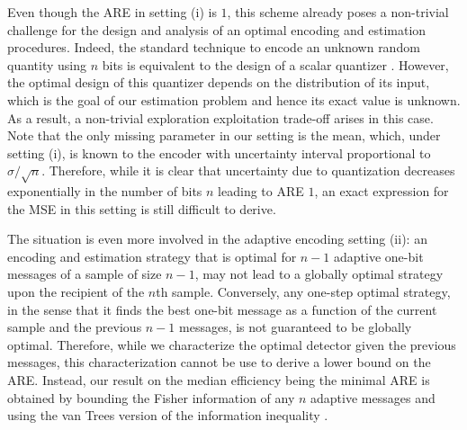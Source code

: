 \documentclass[letterpaper, conference, 11pt]{IEEEtran}      %
\begin{document}
Even though the ARE in setting (i) is $1$, this scheme already poses a non-trivial challenge for the design and analysis of an optimal encoding and estimation procedures. Indeed, the standard technique to encode an unknown random quantity using $n$ bits is equivalent to the design of a scalar quantizer \cite{gray1998quantization}. However, the optimal design of this quantizer depends on the distribution of its input, which is the goal of our estimation problem and hence its exact value is unknown. As a result, a non-trivial exploration exploitation trade-off arises in this case. Note that the only missing parameter in our setting is the mean, which, under setting (i), is known to the encoder with uncertainty interval proportional to $\sigma/\sqrt{n}$. Therefore, while it is clear that uncertainty due to quantization decreases exponentially in the number of bits $n$ leading to ARE $1$, an exact expression for the MSE in this setting is still difficult to derive. \par
The situation is even more involved in the adaptive encoding setting (ii): an encoding and estimation strategy that is optimal for $n-1$ adaptive one-bit messages of a sample of size $n-1$, may not lead to a globally optimal strategy upon the recipient of the $n$th sample. Conversely, any one-step optimal strategy, in the sense that it finds the best one-bit message as a function of the current sample and the previous $n-1$ messages, is not guaranteed to be globally optimal. Therefore, while we characterize the optimal detector given the previous messages, this characterization cannot be use to derive a lower bound on the ARE. Instead, our result on the median efficiency being the minimal ARE is obtained by bounding the Fisher information of any $n$ adaptive messages and using the van Trees version of the information inequality \cite{gill1995applications}. 

\end{document}
